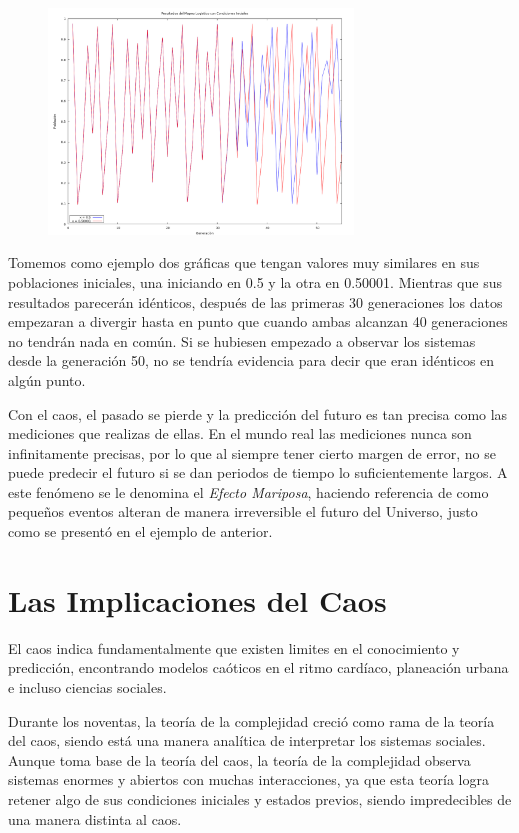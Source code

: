 \documentclass{article}
\begin{document}
	\begin{figure}[h!]
    \includegraphics[height=6cm]{graf12.png}
    \centering
    \end{figure}

Tomemos como ejemplo dos gráficas que tengan valores muy similares en sus poblaciones iniciales, una iniciando en 0.5 y la otra en 0.50001. Mientras que sus resultados parecerán idénticos, después de las primeras 30 generaciones los datos empezaran a divergir hasta en punto que cuando ambas alcanzan 40 generaciones no tendrán nada en común. Si se hubiesen empezado a observar los sistemas desde la generación 50, no se tendría evidencia para decir que eran idénticos en algún punto.

Con el caos, el pasado se pierde y la predicción del futuro es tan precisa como las mediciones que realizas de ellas. En el mundo real las mediciones nunca son infinitamente precisas, por lo que al siempre tener cierto margen de error, no se puede predecir el futuro si se dan periodos de tiempo lo suficientemente largos. A este fenómeno se le denomina el \textit{Efecto Mariposa}, haciendo referencia de como pequeños eventos alteran de manera irreversible el futuro del Universo, justo como se presentó en el ejemplo de anterior.

\section{Las Implicaciones del Caos}
El caos indica fundamentalmente que existen limites en el conocimiento y predicción, encontrando modelos caóticos en el ritmo cardíaco, planeación urbana e incluso ciencias sociales. 

Durante los noventas, la teoría de la complejidad creció como rama de la teoría del caos, siendo está una manera analítica de interpretar los sistemas sociales. Aunque toma base de la teoría del caos, la teoría de la complejidad observa sistemas enormes y abiertos con muchas interacciones, ya que esta teoría logra retener algo de sus condiciones iniciales y estados previos, siendo impredecibles de una manera distinta al caos.
\end{document}
